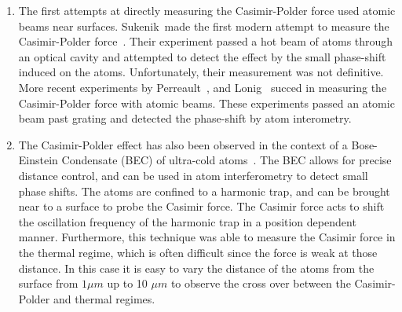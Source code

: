 \begin{enumerate}
  \item 
    The first attempts at directly measuring the Casimir-Polder force used atomic beams 
    near surfaces.  
    Sukenik~\etal made the first modern attempt to measure the Casimir-Polder force~\cite{Sukenik1993}.
    Their experiment passed a hot beam of atoms through an optical cavity and attempted to detect
    the effect by the small phase-shift induced on the atoms.  Unfortunately, their measurement 
    was not definitive.
    More recent experiments by Perreault~\etal\cite{Perreault2005}, and Lonig~\etal\cite{Lonij2009} succed in measuring
    the Casimir-Polder force with atomic beams.  These experiments passed an atomic beam past grating and 
    detected the phase-shift by atom interometry.  %

\item 
    The Casimir-Polder effect has also been observed in the context of a Bose-Einstein Condensate (BEC)
    of ultra-cold atoms~\cite{Harber2005,Obrecht2007}.  The BEC allows for precise distance control,
    and can be used in atom interferometry to detect small phase shifts.    
    The atoms are confined to a harmonic trap, and can be brought near to a surface to probe the Casimir
    force.  The Casimir force acts to shift the oscillation frequency of the harmonic trap in a position
    dependent manner.  
    Furthermore, this technique was able to measure the Casimir force in the thermal regime, which
    is often difficult since the force is weak at those distance.  In this case it is easy to 
    vary the distance of the atoms from the surface from $1\mu m$ up to 10 $\mu m$ to observe
    the cross over between the Casimir-Polder and thermal regimes.



\end{enumerate}
